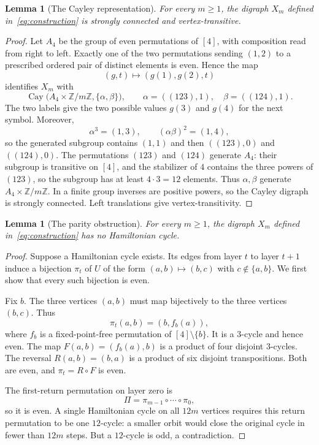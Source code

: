 \documentclass[11pt,a4paper,reqno]{amsart}
\newtheorem{lemma}[theorem]{Lemma}
\theoremstyle{definition}
\theoremstyle{remark}
\numberwithin{equation}{section}
\DeclareMathOperator{\Cay}{Cay}
\newcommand{\Z}{\mathbb Z}
\begin{document}
\begin{lemma}[The Cayley representation]\label{lem:exampleconnected}
For every $m\ge1$, the digraph $X_m$ defined in~\eqref{eq:construction} is strongly connected and vertex-transitive.
\end{lemma}
\begin{proof}
Let $A_4$ be the group of even permutations of $[4]$, with composition read from right to left. Exactly one of the two permutations sending $(1,2)$ to a prescribed ordered pair of distinct elements is even. Hence the map
\[
 (g,t)\longmapsto(g(1),g(2),t)
\]
identifies $X_m$ with
\[
 \Cay\bigl(A_4\times\Z/m\Z,\{\alpha,\beta\}\bigr),
 \qquad \alpha=((123),1),\quad\beta=((124),1).
\]
The two labels give the two possible values $g(3)$ and $g(4)$ for the next symbol. Moreover,
\[
 \alpha^3=(1,3),\qquad(\alpha\beta)^2=(1,4),
\]
so the generated subgroup contains $(1,1)$ and then $((123),0)$ and $((124),0)$. The permutations $(123)$ and $(124)$ generate $A_4$: their subgroup is transitive on $[4]$, and the stabilizer of $4$ contains the three powers of $(123)$, so the subgroup has at least $4\cdot3=12$ elements. Thus $\alpha,\beta$ generate $A_4\times\Z/m\Z$. In a finite group inverses are positive powers, so the Cayley digraph is strongly connected. Left translations give vertex-transitivity.
\end{proof}

\begin{lemma}[The parity obstruction]\label{lem:parity}
For every $m\ge1$, the digraph $X_m$ defined in~\eqref{eq:construction} has no Hamiltonian cycle.
\end{lemma}
\begin{proof}
Suppose a Hamiltonian cycle exists. Its edges from layer $t$ to layer $t+1$ induce a bijection $\pi_t$ of $U$ of the form $(a,b)\mapsto(b,c)$ with $c\notin\{a,b\}$. We first show that every such bijection is even.

Fix $b$. The three vertices $(a,b)$ must map bijectively to the three vertices $(b,c)$. Thus
\[
 \pi_t(a,b)=(b,f_b(a)),
\]
where $f_b$ is a fixed-point-free permutation of $[4]\setminus\{b\}$. It is a $3$-cycle and hence even. The map $F(a,b)=(f_b(a),b)$ is a product of four disjoint $3$-cycles. The reversal $R(a,b)=(b,a)$ is a product of six disjoint transpositions. Both are even, and $\pi_t=R\circ F$ is even.

The first-return permutation on layer zero is
\[
 \Pi=\pi_{m-1}\circ\cdots\circ\pi_0,
\]
so it is even. A single Hamiltonian cycle on all $12m$ vertices requires this return permutation to be one $12$-cycle: a smaller orbit would close the original cycle in fewer than $12m$ steps. But a $12$-cycle is odd, a contradiction.
\end{proof}
\end{document}
